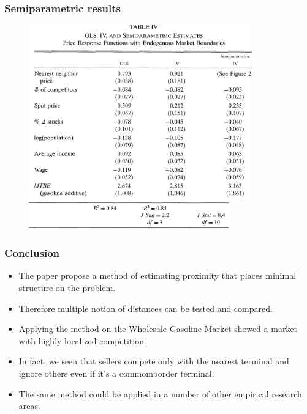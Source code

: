 \documentclass{beamer}
\begin{document}
\begin{frame}
  \frametitle{Semiparametric results}
  \vspace{-0.6cm}
  \begin{figure}
    \includegraphics[width=\linewidth, height=7.5cm]{SemiPar_subres.png}
    \includegraphics[width=\linewidth, height=1.2cm]{SemiPar_subres2.png}
  \end{figure}
\end{frame}

\begin{frame}
  \frametitle{Conclusion}
  \begin{itemize}
    \item The paper propose a method of estimating proximity that places minimal structure on the problem.
    \item Therefore multiple notion of distances can be tested and compared.
    \item Applying the method on the Wholesale Gasoline Market showed a market with highly localized competition.
    \item In fact, we seen that sellers compete only with the nearest terminal and ignore others even if it's a commomborder terminal.
    \item The same method could be applied in a number of other empirical research areas.
  \end{itemize}
  
\end{frame}
\end{document}
